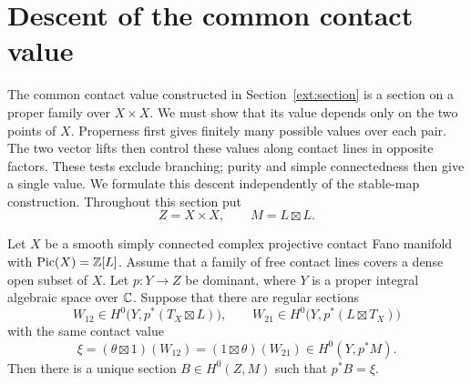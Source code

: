 \section{Descent of the common contact value}
\label{des:section}

The common contact value constructed in Section~\ref{ext:section}
is a section on a proper family over $X\times X$. We must show that its
value depends only on the two points of $X$. Properness first gives
finitely many possible values over each pair. The two vector lifts
then control these values along contact lines in opposite factors.
These tests exclude branching; purity and simple connectedness then
give a single value. We formulate this descent independently of the
stable-map construction. Throughout this section put
\[
Z=X\times X,\qquad M=L\boxtimes L.
\]

\begin{proposition}
\label{des:descent}
Let $X$ be a smooth simply connected complex projective contact Fano
manifold with $\operatorname{Pic}(X)=\mathbb Z[L]$. Assume that a family of free contact
lines covers a dense open subset of $X$. Let $p:Y\to Z$ be dominant,
where $Y$ is a proper integral algebraic space over $\mathbb C$. Suppose that
there are regular sections
\[
W_{12}\in H^0\bigl(Y,p^*(T_X\boxtimes L)\bigr),\qquad
W_{21}\in H^0\bigl(Y,p^*(L\boxtimes T_X)\bigr)
\]
with the same contact value
\begin{equation}\label{des:common-value}
\xi=(\theta\boxtimes 1)(W_{12})
    =(1\boxtimes\theta)(W_{21})\in H^0(Y,p^*M).
\end{equation}
Then there is a unique section $B\in H^0(Z,M)$ such that $p^*B=\xi$.
\end{proposition}

